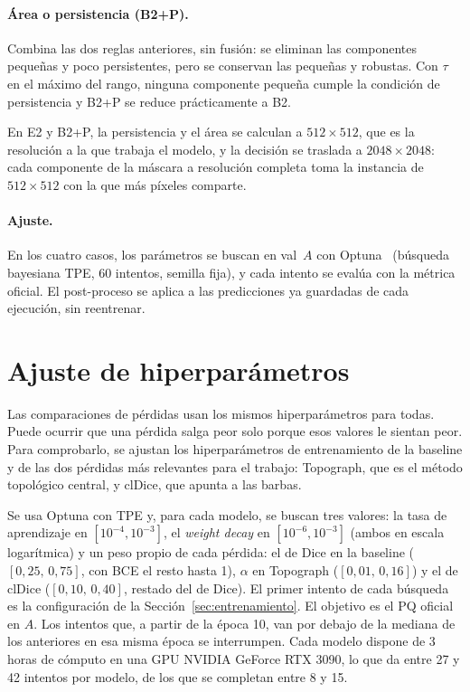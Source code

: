 \paragraph{Área o persistencia (B2+P).} Combina las dos reglas
anteriores, sin fusión: se eliminan las componentes pequeñas y poco
persistentes, pero se conservan las pequeñas y robustas. Con $\tau$ en
el máximo del rango, ninguna componente pequeña cumple la condición de
persistencia y B2+P se reduce prácticamente a B2.

En E2 y B2+P, la persistencia y el área se calculan a $512\times512$,
que es la resolución a la que trabaja el modelo, y la decisión se
traslada a $2048\times2048$: cada componente de la máscara a resolución
completa toma la instancia de $512\times512$ con la que más píxeles
comparte.

\paragraph{Ajuste.} En los cuatro casos, los parámetros se buscan en
val~$A$ con Optuna~\cite{akiba2019} (búsqueda bayesiana TPE, 60
intentos, semilla fija), y cada intento se evalúa con la métrica
oficial. El post-proceso se aplica a las predicciones ya guardadas de
cada ejecución, sin reentrenar.

\section{Ajuste de hiperparámetros}
\label{sec:ajuste-hp}

Las comparaciones de pérdidas usan los mismos hiperparámetros para
todas. Puede ocurrir que una pérdida salga peor solo porque esos
valores le sientan peor. Para comprobarlo, se ajustan los
hiperparámetros de entrenamiento de la baseline y de las dos pérdidas
más relevantes para el trabajo: Topograph, que es el método topológico
central, y clDice, que apunta a las barbas.

Se usa Optuna con TPE y, para cada modelo, se buscan tres valores: la
tasa de aprendizaje en $[10^{-4},10^{-3}]$, el \emph{weight decay} en
$[10^{-6},10^{-3}]$ (ambos en escala logarítmica) y un peso propio de
cada pérdida: el de Dice en la baseline ($[0{,}25,\,0{,}75]$, con
BCE el resto hasta 1), $\alpha$ en Topograph ($[0{,}01,\,0{,}16]$) y el
de clDice ($[0{,}10,\,0{,}40]$, restado del de Dice). El primer intento
de cada búsqueda es la configuración de la
Sección~\ref{sec:entrenamiento}. El objetivo es el PQ oficial en $A$.
Los intentos que, a partir de la época 10, van por debajo de la mediana
de los anteriores en esa misma época se interrumpen. Cada modelo dispone
de 3 horas de cómputo en una GPU NVIDIA GeForce RTX 3090, lo que da
entre 27 y 42 intentos por modelo, de los que se completan entre 8 y 15.

